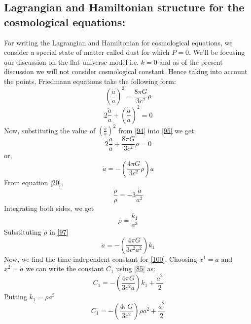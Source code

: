 \documentclass[12pt]{article}
\begin{document}
\subsection{Lagrangian and Hamiltonian structure for the cosmological equations:}
For writing the Lagrangian and Hamiltonian for cosmological equations, we consider a special state of matter called dust for which $P=0$. We'll be focusing our discussion on the flat universe model i.e. $k=0$ and as of the present discussion we will not consider cosmological constant. Hence taking into account the points, Friedmann equations take the following form:
\begin{equation}
\left(\frac{\dot{a}}{a}\right)^{2}=\frac{8 \pi G}{3 c^{2}} \rho
\label{94}
\end{equation}
\begin{equation}
2\frac{\ddot{a}}{a} + \left(\frac{\dot{a}}{a}\right)^{2} = 0
\label{95}
\end{equation}
Now, substituting the value of $\left(\frac{\dot{a}}{a}\right)^{2}$ from \eqref{94} into \eqref{95} we get:
\begin{equation}
2\frac{\ddot{a}}{a} + \frac{8 \pi G}{3 c^{2}} \rho=0 \label{96}
\end{equation}
or,
\begin{equation}
\ddot{a}= -\left(\frac{4 \pi G}{3 c^{2}} \rho\right) a \label{97}
\end{equation}
From equation \eqref{20},
\begin{equation}
\frac{\dot{\rho}}{\rho} =-3 \frac{\dot{a}}{a^{2}} \label{98}
\end{equation}
Integrating both sides, we get
\begin{equation}
\rho = \frac{k_{1}}{a^{3}} \label{99}
\end{equation}
Substituting $\rho$ in \eqref{97}
\begin{equation}
\ddot{a}= -\left(\frac{4 \pi G}{3 c^{2} a^{2}} \right) k_{1} \label{100}
\end{equation}
Now, we find the time-independent constant for \eqref{100}. Choosing $x^{1}=a$ and $x^{2}=\dot{a}$ we can write the constant $C_{1}$ using \eqref{85} as:
\begin{equation}
C_{1}= -\left(\frac{4 \pi G}{3 c^{2} a} \right) k_{1} +\frac{\dot{a}^{2}}{2}
\end{equation}
Putting $k_{1}=\rho a^{3}$
\begin{equation}
C_{1}=-\left(\frac{4 \pi G}{3 c^{2} }\right) \rho a^{2} +\frac{\dot{a}^{2}}{2}
\end{equation}
\end{document}
